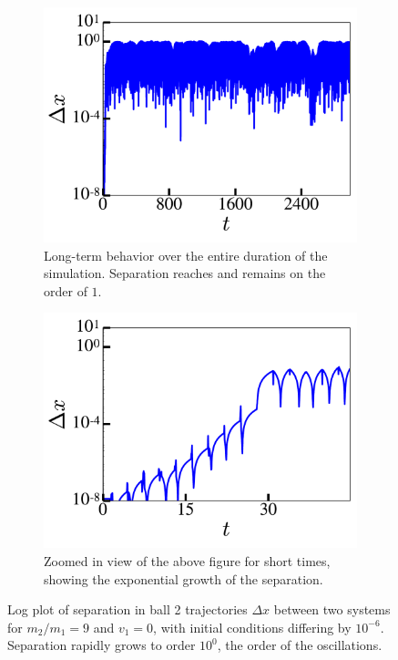 \documentclass[pra,twocolumn,showpacs,amsmath,amssymb, aps, 10pt]{revtex4-1}
\begin{document}
\begin{figure}[h]
  \begin{subfigure}{\linewidth}
    \includegraphics[width=0.8\linewidth]{r0_1_lyapunov}
    \caption{Long-term behavior over the entire duration of the simulation.
    Separation reaches and remains on the order of $1$.}
    \label{fig:9-lyapunov}
  \end{subfigure}

  \begin{subfigure}{0.8\linewidth}
    \includegraphics[width=\linewidth]{zoomed_r0_1_lyapunov}
    \caption{Zoomed in view of the above figure for short times, showing the
    exponential growth of the separation.}
    \label{fig:9-lyapunov-zoomed}
  \end{subfigure}

  \caption{Log plot of separation in ball 2 trajectories $\Delta x$
  between two systems for $m_2/m_1 = 9$ and
  $v_1=0$, with
  initial conditions differing by $10^{-6}$. Separation rapidly grows to order
  $10^0$, the order of the oscillations.}
\end{figure}
\end{document}
